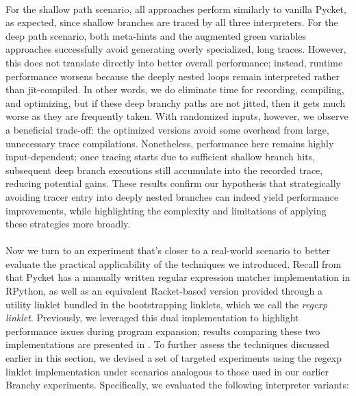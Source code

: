     \paragraph{}%
      For the shallow path scenario, all approaches perform similarly to vanilla Pycket, as expected, since shallow branches are traced by all three interpreters. For the deep path scenario, both meta-hints and the augmented green variables approaches successfully avoid generating overly specialized, long traces. However, this does not translate directly into better overall performance; instead, runtime performance worsens because the deeply nested loops remain interpreted rather than \gls{jit}-compiled. In other words, we do eliminate time for recording, compiling, and optimizing, but if these deep branchy paths are not \gls{jit}ted, then it gets much worse as they are frequently taken. With randomized inputs, however, we observe a beneficial trade-off: the optimized versions avoid some overhead from large, unnecessary trace compilations. Nonetheless, performance here remains highly input-dependent; once tracing starts due to sufficient shallow branch hits, subsequent deep branch executions still accumulate into the recorded trace, reducing potential gains. These results confirm our hypothesis that strategically avoiding tracer entry into deeply nested branches can indeed yield performance improvements, while highlighting the complexity and limitations of applying these strategies more broadly.

    \paragraph{}%
      Now we turn to an experiment that's closer to a real-world scenario to better evaluate the practical applicability of the techniques we introduced. Recall from  that Pycket has a manually written regular expression matcher implementation in RPython, as well as an equivalent Racket-based version provided through a utility linklet bundled in the bootstrapping linklets, which we call the \emph{regexp linklet}. Previously, we leveraged this dual implementation to highlight performance issues during program expansion; results comparing these two implementations are presented in . To further assess the techniques discussed earlier in this section, we devised a set of targeted experiments using the regexp linklet implementation under scenarios analogous to those used in our earlier Branchy experiments. Specifically, we evaluated the following interpreter variants:

